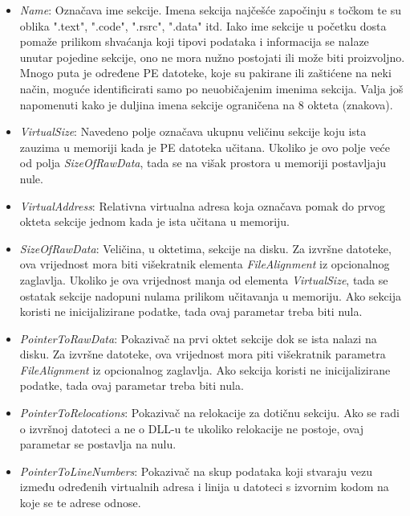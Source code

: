 \documentclass[times, utf8, diplomski, numeric]{fer}
\begin{document}
\begin{itemize}

\item \emph{Name}: Označava ime sekcije. Imena sekcija najčešće
započinju s točkom te su oblika ".text", ".code", ".rsrc",
".data" itd. Iako ime sekcije u početku dosta pomaže prilikom
shvaćanja koji tipovi podataka i informacija se nalaze unutar
pojedine sekcije, ono ne mora nužno postojati ili može biti
proizvoljno. Mnogo puta je određene PE datoteke, koje su pakirane
ili zaštićene na neki način, moguće identificirati samo po
neuobičajenim imenima sekcija. Valja još napomenuti kako je
duljina imena sekcije ograničena na 8 okteta (znakova).

\item \emph{VirtualSize}: Navedeno polje označava ukupnu veličinu
sekcije koju ista zauzima u memoriji kada je PE datoteka učitana.
Ukoliko je ovo polje veće od polja \emph{SizeOfRawData}, tada se
na višak prostora u memoriji postavljaju nule.

\item \emph{VirtualAddress}: Relativna virtualna adresa koja
označava pomak do prvog okteta sekcije jednom kada je ista
učitana u memoriju.

\item \emph{SizeOfRawData}: Veličina, u oktetima, sekcije na
disku. Za izvršne datoteke, ova vrijednost mora biti višekratnik
elementa \emph{FileAlignment} iz opcionalnog zaglavlja. Ukoliko
je ova vrijednost manja od elementa \emph{VirtualSize}, tada se
ostatak sekcije nadopuni nulama prilikom učitavanja u memoriju.
Ako sekcija koristi ne inicijalizirane podatke, tada ovaj
parametar treba biti nula.

\item \emph{PointerToRawData}: Pokazivač na prvi oktet sekcije
dok se ista nalazi na disku. Za izvršne datoteke, ova vrijednost
mora piti višekratnik parametra \emph{FileAlignment} iz
opcionalnog zaglavlja. Ako sekcija koristi ne inicijalizirane
podatke, tada ovaj parametar treba biti nula.

\item \emph{PointerToRelocations}: Pokazivač na relokacije za
dotičnu sekciju. Ako se radi o izvršnoj datoteci a ne o DLL-u
te ukoliko relokacije ne postoje, ovaj parametar se postavlja na
nulu.

\item \emph{PointerToLineNumbers}: Pokazivač na skup podataka
koji stvaraju vezu između određenih virtualnih adresa i linija u
datoteci s izvornim kodom na koje se te adrese odnose.


\end{itemize}
\end{document}
